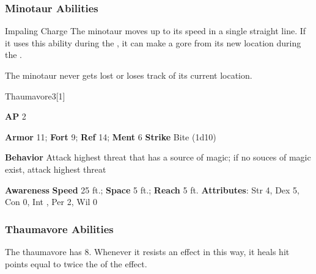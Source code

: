 \subsubsection{Minotaur Abilities}

\begin{ability}{Impaling Charge}
The minotaur moves up to its speed in a single straight line.
If it uses this ability during the , it can make a gore  from its new location during the .
\end{ability}

The minotaur never gets lost or loses track of its current location.





\begin{monsection}{Thaumavore}{3}[1]
\vspace{-1em}\vspace{-1em}
\begin{spellcontent}
\begin{spelltargetinginfo}
{\textbf{AP} 2}

\pari \textbf{Armor} 11;
\textbf{Fort} 9;
\textbf{Ref} 14;
\textbf{Ment} 6
\pari \textbf{Strike} Bite  (1d10)



\pari \textbf{Behavior} Attack highest threat that has a source of magic; if no souces of magic exist, attack highest threat
\end{spelltargetinginfo}
\end{spellcontent}

\begin{monsterfooter}
\pari \textbf{Awareness} 
\pari \textbf{Speed} 25 ft.;
\textbf{Space} 5 ft.;
\textbf{Reach} 5 ft.
\pari \textbf{Attributes}:
Str 4,
Dex 5,
Con 0,
Int ,
Per 2,
Wil 0
\end{monsterfooter}
\end{monsection}


\subsubsection{Thaumavore Abilities}

The thaumavore has  8.
Whenever it resists an effect in this way, it heals hit points equal to twice the  of the effect.

